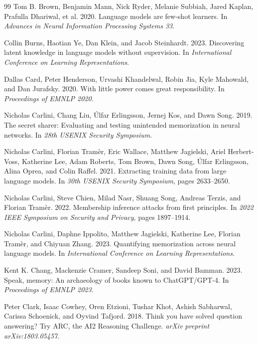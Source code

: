 \documentclass[10pt,twocolumn,letterpaper]{article}
\begin{document}
\begin{thebibliography}{99}
Tom B. Brown, Benjamin Mann, Nick Ryder, Melanie Subbiah, Jared Kaplan, Prafulla Dhariwal, et al. 2020.
Language models are few-shot learners.
In \emph{Advances in Neural Information Processing Systems 33}.

Collin Burns, Haotian Ye, Dan Klein, and Jacob Steinhardt. 2023.
Discovering latent knowledge in language models without supervision.
In \emph{International Conference on Learning Representations}.

Dallas Card, Peter Henderson, Urvashi Khandelwal, Robin Jia, Kyle Mahowald, and Dan Jurafsky. 2020.
With little power comes great responsibility.
In \emph{Proceedings of EMNLP 2020}.

Nicholas Carlini, Chang Liu, \'Ulfar Erlingsson, Jernej Kos, and Dawn Song. 2019.
The secret sharer: Evaluating and testing unintended memorization in neural networks.
In \emph{28th USENIX Security Symposium}.

Nicholas Carlini, Florian Tram\`er, Eric Wallace, Matthew Jagielski, Ariel Herbert-Voss, Katherine Lee, Adam Roberts, Tom Brown, Dawn Song, \'Ulfar Erlingsson, Alina Oprea, and Colin Raffel. 2021.
Extracting training data from large language models.
In \emph{30th USENIX Security Symposium}, pages 2633--2650.

Nicholas Carlini, Steve Chien, Milad Nasr, Shuang Song, Andreas Terzis, and Florian Tram\`er. 2022.
Membership inference attacks from first principles.
In \emph{2022 IEEE Symposium on Security and Privacy}, pages 1897--1914.

Nicholas Carlini, Daphne Ippolito, Matthew Jagielski, Katherine Lee, Florian Tram\`er, and Chiyuan Zhang. 2023.
Quantifying memorization across neural language models.
In \emph{International Conference on Learning Representations}.

Kent K. Chang, Mackenzie Cramer, Sandeep Soni, and David Bamman. 2023.
Speak, memory: An archaeology of books known to ChatGPT/GPT-4.
In \emph{Proceedings of EMNLP 2023}.

Peter Clark, Isaac Cowhey, Oren Etzioni, Tushar Khot, Ashish Sabharwal, Carissa Schoenick, and Oyvind Tafjord. 2018.
Think you have solved question answering? Try ARC, the AI2 Reasoning Challenge.
\emph{arXiv preprint arXiv:1803.05457}.


\end{thebibliography}
\end{document}
